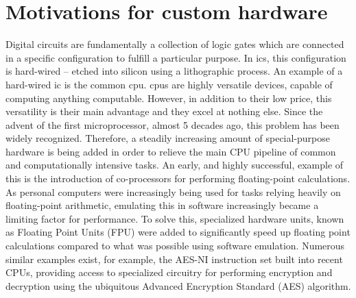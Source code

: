 \section{Motivations for custom hardware}






Digital circuits are fundamentally a collection of logic gates which are
connected in a specific configuration to fulfill a particular purpose. In
\glspl{ic}, this configuration is hard-wired -- etched into
silicon using a lithographic process. An example of a hard-wired \gls{ic} is the
common \gls{cpu}. \glspl{cpu} are highly versatile devices, capable
of computing anything computable. However, in addition to their low price, this
versatility is their main advantage and they excel at nothing else.
Since the advent of the first microprocessor, almost 5 decades ago, this problem
has been widely recognized. Therefore, a steadily increasing amount of
special-purpose hardware is being added in order to relieve the main CPU
pipeline of common and computationally intensive tasks. An early, and highly
successful, example of this is the introduction of co-processors for performing
floating-point calculations. As personal computers were increasingly being used
for tasks relying heavily on floating-point arithmetic, emulating this in
software increasingly became a limiting factor for performance. To solve this,
specialized hardware units, known as Floating Point Units (FPU) were added to
significantly speed up floating point calculations compared to what was possible
using software emulation. Numerous similar examples exist, for example, the
AES-NI instruction set built into recent CPUs, providing access to specialized
circuitry for performing encryption and decryption using the ubiquitous Advanced
Encryption Standard (AES) algorithm.

